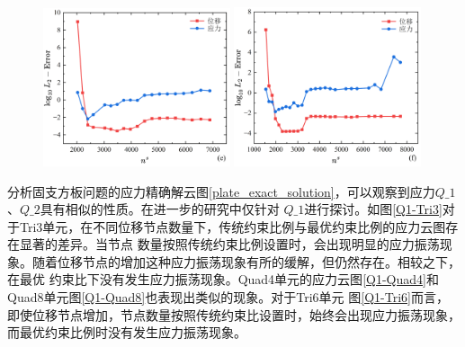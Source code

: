 \begin{figure}[H]
\begin{subcaptiongroup}
    \label{Q8-l2-ns16}
    \end{subcaptiongroup}
    \begin{subcaptiongroup}
    \includegraphics[width=0.49\textwidth]{figures/shearlocking/T6-l2-ns32.png}
    \label{T6-l2-ns32}
    \includegraphics[width=0.49\textwidth]{figures/shearlocking/Q8-l2-ns32.png}
    \label{Q8-l2-ns32}
    \end{subcaptiongroup}
\caption{}
\label{quad-ns}
\end{figure}

分析固支方板问题的应力精确解云图\ref{plate_exact_solution}，可以观察到应力$Q\_1$、$Q\_2$具有相似的性质。在进一步的研究中仅针对
$Q\_1$进行探讨。如图\ref{Q1-Tri3}对于Tri3单元，在不同位移节点数量下，传统约束比例与最优约束比例的应力云图存在显著的差异。当节点
数量按照传统约束比例设置时，会出现明显的应力振荡现象。随着位移节点的增加这种应力振荡现象有所的缓解，但仍然存在。相较之下，在最优
约束比下没有发生应力振荡现象。Quad4单元的应力云图\ref{Q1-Quad4}和Quad8单元图\ref{Q1-Quad8}也表现出类似的现象。对于Tri6单元
图\ref{Q1-Tri6}而言，即使位移节点增加，节点数量按照传统约束比设置时，始终会出现应力振荡现象，而最优约束比例时没有发生应力振荡现象。

